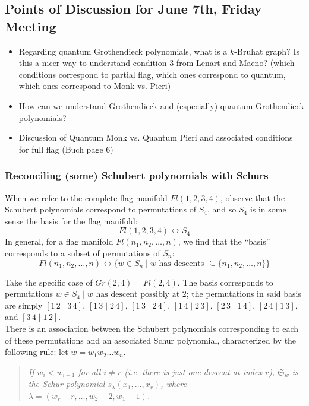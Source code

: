 \subsection{Points of Discussion for June 7th, Friday Meeting}

\begin{itemize}
    \item Regarding quantum Grothendieck polynomials, what is a $k$-Bruhat graph? Is this a nicer way to understand condition 3 from Lenart and Maeno? (which conditions correspond to partial flag, which ones correspond to quantum, which ones correspond to Monk vs. Pieri)
    \item How can we understand Grothendieck and (especially) quantum Grothendieck polynomials? 
    \item Discussion of Quantum Monk vs. Quantum Pieri and associated conditions for full flag (Buch page 6)

\end{itemize}


\subsubsection{Reconciling (some) Schubert polynomials with Schurs}
When we refer to the complete flag manifold $Fl(1, 2, 3, 4)$, observe that the Schubert polynomials correspond to permutations of $S_4$, and so $S_4$ is in some sense the basis for the flag manifold:
\[
    Fl(1, 2, 3, 4) \leftrightarrow S_4
\]
In general, for a flag manifold $Fl(n_1, n_2, \dots, n)$, we find that the ``basis'' corresponds to a subset of permutations of $S_n$:
\[
    Fl(n_1, n_2, \dots, n) \leftrightarrow \{ w \in S_n \mid w \text{ has descents } \subseteq \{ n_1, n_2, \dots, n\} \}
\]

Take the specific case of $Gr(2, 4) = Fl(2, 4)$. The basis corresponds to permutations 
$w \in S_4 \mid w \text{ has descent possibly at $2$}$; the permutations in said basis are simply $[1\, 2 \mid 3 \,4]$, $[1\,3 \mid 2\,4]$, $[1\, 3 \mid 2\,4]$, $[1\,4 \mid 2\,3]$, $[2\,3 \mid 1\,4]$, $[2\,4 \mid 1\,3]$, and $[3\,4 \mid 1\,2]$. \\

There is an association between the Schubert polynomials corresponding to each of these permutations and an associated Schur polynomial, characterized by the following rule: let $w = w_1 w_2 \dots w_n$. 
\begin{quote}
\textit{If $w_i < w_{i+1}$ for all $i \neq r$ (i.e. there is just one descent at index $r$), $\mathfrak{S}_w$ is the Schur polynomial $s_\lambda(x_1, \dots, x_r)$, where $\lambda = (w_r - r, \dots, w_2 - 2, w_1 - 1)$.}
\end{quote}


